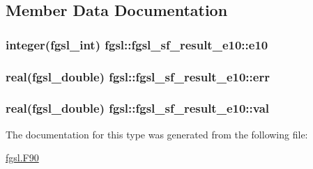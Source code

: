 \subsection{Member Data Documentation}
\hypertarget{structfgsl_1_1fgsl__sf__result__e10_a9fd222d7b55ec57cb27b8659b09c13b0}{
\subsubsection[{e10}]{\setlength{\rightskip}{0pt plus 5cm}integer({\bf fgsl\-\_\-int}) fgsl\-::fgsl\-\_\-sf\-\_\-result\-\_\-e10\-::e10}}\label{structfgsl_1_1fgsl__sf__result__e10_a9fd222d7b55ec57cb27b8659b09c13b0}
\hypertarget{structfgsl_1_1fgsl__sf__result__e10_a3ae421b4307c79b813f7d70187290fd8}{
\subsubsection[{err}]{\setlength{\rightskip}{0pt plus 5cm}real({\bf fgsl\-\_\-double}) fgsl\-::fgsl\-\_\-sf\-\_\-result\-\_\-e10\-::err}}\label{structfgsl_1_1fgsl__sf__result__e10_a3ae421b4307c79b813f7d70187290fd8}
\hypertarget{structfgsl_1_1fgsl__sf__result__e10_a5b7c6b37adb7724bdf69637b74f65395}{
\subsubsection[{val}]{\setlength{\rightskip}{0pt plus 5cm}real({\bf fgsl\-\_\-double}) fgsl\-::fgsl\-\_\-sf\-\_\-result\-\_\-e10\-::val}}\label{structfgsl_1_1fgsl__sf__result__e10_a5b7c6b37adb7724bdf69637b74f65395}


The documentation for this type was generated from the following file\-:\begin{DoxyCompactItemize}
\item 
\hyperlink{fgsl_8F90}{fgsl.\-F90}\end{DoxyCompactItemize}
